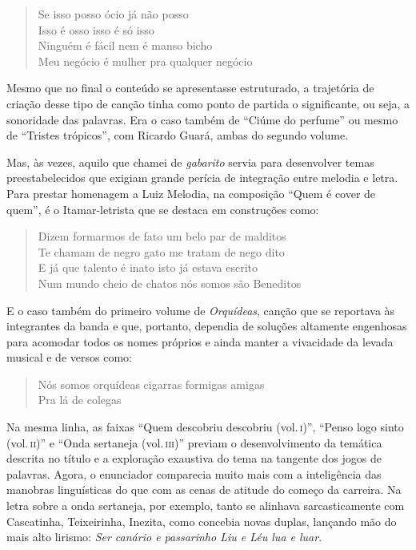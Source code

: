 \begin{verse}
\small{Se isso posso ócio já não posso\\
Isso é osso isso é só isso\\
Ninguém é fácil nem é manso bicho\\
Meu negócio é mulher pra qualquer negócio}
\end{verse}

Mesmo que no final o conteúdo se apresentasse estruturado, a trajetória
de criação desse tipo de canção tinha como ponto de partida o
significante, ou seja, a sonoridade das palavras. Era o caso também de
``Ciúme do perfume'' ou mesmo de ``Tristes trópicos'', com Ricardo Guará, ambas
do segundo volume.

Mas, às vezes, aquilo que chamei de \textit{gabarito} servia para desenvolver
temas preestabelecidos que exigiam grande perícia de integração entre
melodia e letra. Para prestar homenagem a Luiz Melodia, na composição
``Quem é cover de quem'', é o Itamar-letrista que se destaca em construções
como:

\begin{verse}
\small{Dizem formarmos de fato um belo par de malditos\\
Te chamam de negro gato me tratam de nego dito\\
E já que talento é inato isto já estava escrito\\
Num mundo cheio de chatos nós somos são Beneditos}
\end{verse}

E o caso também do primeiro volume de \textit{Orquídeas}, canção que se reportava às
integrantes da banda e que, portanto, dependia de soluções altamente
engenhosas para acomodar todos os nomes próprios e ainda manter a
vivacidade da levada musical e de versos como:

\begin{verse}
\small{Nós somos orquídeas cigarras formigas amigas\\
Pra lá de colegas}
\end{verse}

Na mesma linha, as faixas ``Quem descobriu descobriu (vol.\,\textsc{i})'', ``Penso logo
sinto (vol.\,\textsc{ii})'' e ``Onda sertaneja (vol.\,\textsc{iii})'' previam o desenvolvimento da
temática descrita no título e a exploração exaustiva do tema na tangente
dos jogos de palavras. Agora, o enunciador comparecia muito mais com a
inteligência das manobras linguísticas do que com as cenas de atitude do
começo da carreira. Na letra sobre a onda sertaneja, por exemplo, tanto
se alinhava sarcasticamente com Cascatinha, Teixeirinha, Inezita, como
concebia novas duplas, lançando mão do mais alto lirismo: \textit{Ser canário
e passarinho Liu e Léu lua e luar}.


